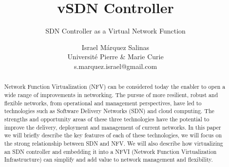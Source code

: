 \documentclass[sigconf]{Template}
\begin{document}
\title{vSDN Controller}
\subtitle{SDN Controller as a Virtual Network Function}
\author{Israel M\'{a}rquez Salinas \\Universit\'{e} Pierre \& Marie Curie \\s.marquez.israel@gmail.com}
\maketitle


\begin{abstract}
	Network Function Virtualization (NFV) can be considered today the enabler to open a wide range of improvements in networking. The pursue of more resilient, robust and flexible networks, from operational and management perspectives, have led to technologies such as Software Delivery Networks (SDN) and cloud computing. The strengths and opportunity areas of these three technologies have the potential to improve the delivery, deployment and management of current networks.
	In this paper we will briefly describe the key features of each of these technologies, we will focus on the strong relationship between SDN and NFV. We will also describe how virtualizing an SDN controller and embedding it into a NFVI (Network Function Virtualization Infrastructure) can simplify and add value to network management and flexibility.
	
\end{abstract}
\end{document}
